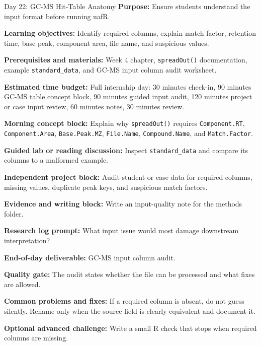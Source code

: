 \begin{dailybox}{Day 22: GC-MS Hit-Table Anatomy}
\textbf{Purpose:} Ensure students understand the input format before running uafR.

\textbf{Learning objectives:} Identify required columns, explain match factor, retention time, base peak, component area, file name, and suspicious values.

\textbf{Prerequisites and materials:} Week 4 chapter, \texttt{spreadOut()} documentation, example \texttt{standard\_data}, and GC-MS input column audit worksheet.

\textbf{Estimated time budget:} Full internship day: 30 minutes check-in, 90 minutes GC-MS table concept block, 90 minutes guided input audit, 120 minutes project or case input review, 60 minutes notes, 30 minutes review.

\textbf{Morning concept block:} Explain why \texttt{spreadOut()} requires \texttt{Component.RT}, \texttt{Component.Area}, \texttt{Base.Peak.MZ}, \texttt{File.Name}, \texttt{Compound.Name}, and \texttt{Match.Factor}.

\textbf{Guided lab or reading discussion:} Inspect \texttt{standard\_data} and compare its columns to a malformed example.

\textbf{Independent project block:} Audit student or case data for required columns, missing values, duplicate peak keys, and suspicious match factors.

\textbf{Evidence and writing block:} Write an input-quality note for the methods folder.

\textbf{Research log prompt:} What input issue would most damage downstream interpretation?

\textbf{End-of-day deliverable:} GC-MS input column audit.

\textbf{Quality gate:} The audit states whether the file can be processed and what fixes are allowed.

\textbf{Common problems and fixes:} If a required column is absent, do not guess silently. Rename only when the source field is clearly equivalent and document it.

\textbf{Optional advanced challenge:} Write a small R check that stops when required columns are missing.
\end{dailybox}

